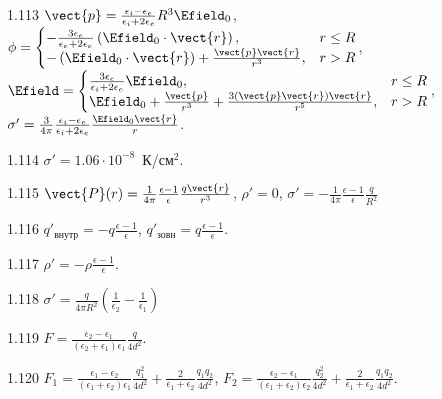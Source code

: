\begin{Solution}{1.{113}}
	$\vect{p} = \frac{\epsilon_i - \epsilon_e}{\epsilon_i + 2\epsilon_e}R^3\Efield_0$,
	$
		\phi =
		\begin{cases}
			-\frac{3\epsilon_e}{\epsilon_e + 2\epsilon_e}\left( \Efield_0\cdot \vect{r}\right), & r \le R \\
			-\left( \Efield_0\cdot \vect{r}\right) + \frac{\vect{p} \vect{r}}{r^3},             & r > R
		\end{cases}
	$,\\
	$
		\Efield =
		\begin{cases}
			\frac{3\epsilon_e}{\epsilon_i + 2\epsilon_e} \Efield_0,                                 & r \le R \\
			\Efield_0 + \frac{\vect{p}}{r^3} + \frac{3\left(\vect{p}\vect{r}\right)\vect{r} }{r^5}, & r > R
		\end{cases}
	$,
	$\sigma' = \frac{3}{4\pi} \frac{\epsilon_i - \epsilon_e}{\epsilon_i + 2\epsilon_e} \frac{\Efield_0\vect{r}}{r}$.
\end{Solution}
\begin{Solution}{1.{114}}
	$\sigma' = 1.06\cdot10^{-8}$~К/см$^2$.
\end{Solution}
\begin{Solution}{1.{115}}
	$\vect{P}(r) = \frac{1}{4\pi}\frac{\epsilon -1 }{\epsilon}\frac{q\vect{r}}{r^3}$,
	$\rho'=0$,
	$\sigma'=  - \frac{1}{4\pi}\frac{\epsilon -1 }{\epsilon}\frac{q}{R^2}$
\end{Solution}
\begin{Solution}{1.{116}}
		$q'_\text{внутр} = -q\frac{\epsilon - 1}{\epsilon}$, 	$q'_\text{зовн} = q\frac{\epsilon - 1}{\epsilon}$.
	
\end{Solution}
\begin{Solution}{1.{117}}
		$\rho' = -\rho \frac{\epsilon - 1}{\epsilon}$.
	
\end{Solution}
\begin{Solution}{1.{118}}
	$\sigma' = \frac{q}{4\pi R^2}\left( \frac{1}{\epsilon_2} - \frac{1}{\epsilon_1} \right) $
\end{Solution}
\begin{Solution}{1.{119}}
	$F = \frac{\epsilon_2 - \epsilon_1}{(\epsilon_2 + \epsilon_1)\epsilon_1} \frac{q}{4d^2}$.
\end{Solution}
\begin{Solution}{1.{120}}
	$F_1 = \frac{\epsilon_1 - \epsilon_2}{(\epsilon_1 + \epsilon_2)\epsilon_1} \frac{q_1^2}{4d^2} + \frac{2}{\epsilon_1 + \epsilon_2} \frac{q_1q_2}{4d^2}$,
	$F_2 = \frac{\epsilon_2 - \epsilon_1}{(\epsilon_1 + \epsilon_2)\epsilon_2} \frac{q_2^2}{4d^2} + \frac{2}{\epsilon_1 + \epsilon_2} \frac{q_1q_2}{4d^2}$.
\end{Solution}
